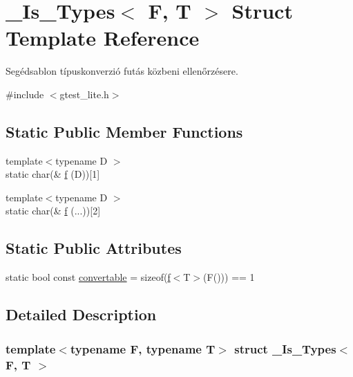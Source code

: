 \hypertarget{struct___is___types}{}\section{\+\_\+\+Is\+\_\+\+Types$<$ F, T $>$ Struct Template Reference}
\label{struct___is___types}


Segédsablon típuskonverzió futás közbeni ellenőrzésere.  




{\ttfamily \#include $<$gtest\+\_\+lite.\+h$>$}

\subsection*{Static Public Member Functions}
\begin{DoxyCompactItemize}
\item 
{\footnotesize template$<$typename D $>$ }\\static char(\& \hyperlink{struct___is___types_a56e08a2768c571caab81e9bc47d5acc6}{f} (D))\mbox{[}1\mbox{]}
\item 
{\footnotesize template$<$typename D $>$ }\\static char(\& \hyperlink{struct___is___types_a013da65c5a92e9bd02f5d361c10d376d}{f} (...))\mbox{[}2\mbox{]}
\end{DoxyCompactItemize}
\subsection*{Static Public Attributes}
\begin{DoxyCompactItemize}
\item 
static bool const \hyperlink{struct___is___types_aef853f15f013611d0890cb6fc408ae47}{convertable} = sizeof(\hyperlink{struct___is___types_a56e08a2768c571caab81e9bc47d5acc6}{f}$<$T$>$(F())) == 1
\end{DoxyCompactItemize}


\subsection{Detailed Description}
\subsubsection*{template$<$typename F, typename T$>$\newline
struct \+\_\+\+Is\+\_\+\+Types$<$ F, T $>$}

